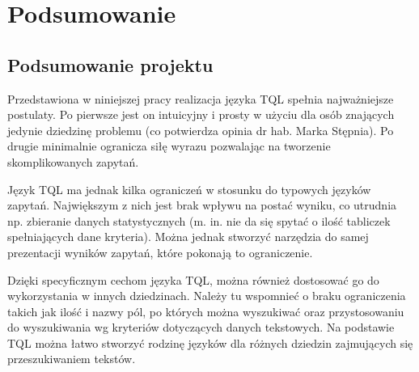 \chapter*{Podsumowanie}
% 

\section*{Podsumowanie projektu}
Przedstawiona w niniejszej pracy realizacja języka TQL spełnia najważniejsze postulaty. Po pierwsze jest on intuicyjny i prosty w użyciu dla osób znających jedynie dziedzinę problemu (co potwierdza opinia dr hab. Marka Stępnia). Po drugie minimalnie ogranicza siłę wyrazu pozwalając na tworzenie skomplikowanych zapytań.

Język TQL ma jednak kilka ograniczeń w stosunku do typowych języków zapytań. Największym z nich jest brak wpływu na postać wyniku, co utrudnia np. zbieranie danych statystycznych (m. in. nie da się spytać o ilość tabliczek spełniających dane kryteria). Można jednak stworzyć narzędzia do samej prezentacji wyników zapytań, które pokonają to ograniczenie. 


Dzięki specyficznym cechom języka TQL, można również dostosować go do wykorzystania w innych dziedzinach. Należy tu wspomnieć o braku ograniczenia takich jak ilość i nazwy pól, po których można wyszukiwać oraz przystosowaniu do wyszukiwania wg kryteriów dotyczących danych tekstowych. Na podstawie TQL można łatwo stworzyć rodzinę języków dla różnych dziedzin zajmujących się przeszukiwaniem tekstów.

